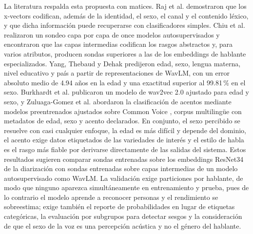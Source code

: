\documentclass[11pt,a4paper]{article}
\begin{document}
La literatura respalda esta propuesta con matices. Raj et al. \cite{raj2019} demostraron que los x-vectors codifican, además de la identidad, el sexo, el canal y el contenido léxico, y que dicha información puede recuperarse con clasificadores simples. Chiu et al. \cite{chiu2025} realizaron un sondeo capa por capa de once modelos autosupervisados y encontraron que las capas intermedias codifican los rasgos abstractos y, para varios atributos, producen sondas superiores a las de los embeddings de hablante especializados. Yang, Thebaud y Dehak \cite{yang2025} predijeron edad, sexo, lengua materna, nivel educativo y país a partir de representaciones de WavLM, con un error absoluto medio de 4.94 años en la edad y una exactitud superior al 99.81\,\% en el sexo. Burkhardt et al. \cite{burkhardt2023} publicaron un modelo de wav2vec 2.0 ajustado para edad y sexo, y Zuluaga-Gomez et al. \cite{zuluagagomez2023} abordaron la clasificación de acentos mediante modelos preentrenados ajustados sobre Common Voice \cite{ardila2020}, corpus multilingüe con metadatos de edad, sexo y acento declarados. En conjunto, el sexo percibido se resuelve con casi cualquier enfoque, la edad es más difícil y depende del dominio, el acento exige datos etiquetados de las variedades de interés y el estilo de habla es el rasgo más fiable por derivarse directamente de las salidas del sistema. Estos resultados sugieren comparar sondas entrenadas sobre los embeddings ResNet34 de la diarización con sondas entrenadas sobre capas intermedias de un modelo autosupervisado como WavLM. La validación exige particiones por hablante, de modo que ninguno aparezca simultáneamente en entrenamiento y prueba, pues de lo contrario el modelo aprende a reconocer personas y el rendimiento se sobreestima; exige también el reporte de probabilidades en lugar de etiquetas categóricas, la evaluación por subgrupos para detectar sesgos y la consideración de que el sexo de la voz es una percepción acústica y no el género del hablante.
\end{document}
